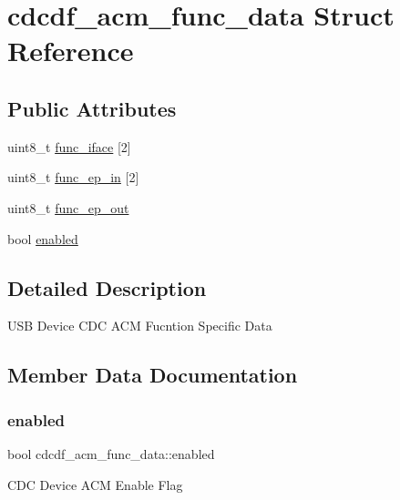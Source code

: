 \hypertarget{structcdcdf__acm__func__data}{}\section{cdcdf\+\_\+acm\+\_\+func\+\_\+data Struct Reference}
\label{structcdcdf__acm__func__data}
\subsection*{Public Attributes}
\begin{DoxyCompactItemize}
\item 
uint8\+\_\+t \hyperlink{structcdcdf__acm__func__data_abe8f7690dc20ef4a5a575596e6c239a3}{func\+\_\+iface} \mbox{[}2\mbox{]}
\item 
uint8\+\_\+t \hyperlink{structcdcdf__acm__func__data_aade2fc3439a0368a7797baff2b71c7c6}{func\+\_\+ep\+\_\+in} \mbox{[}2\mbox{]}
\item 
uint8\+\_\+t \hyperlink{structcdcdf__acm__func__data_a4ed25f383f77e89eb3ce6b5a48b99c6f}{func\+\_\+ep\+\_\+out}
\item 
bool \hyperlink{structcdcdf__acm__func__data_a0c534df649d7719a09d387855b62798c}{enabled}
\end{DoxyCompactItemize}


\subsection{Detailed Description}
U\+SB Device C\+DC A\+CM Fucntion Specific Data 

\subsection{Member Data Documentation}
\mbox{\label{structcdcdf__acm__func__data_a0c534df649d7719a09d387855b62798c}} 
\subsubsection{\texorpdfstring{enabled}{enabled}}
{\footnotesize\ttfamily bool cdcdf\+\_\+acm\+\_\+func\+\_\+data\+::enabled}

C\+DC Device A\+CM Enable Flag \mbox{\label{structcdcdf__acm__func__data_aade2fc3439a0368a7797baff2b71c7c6}} 
